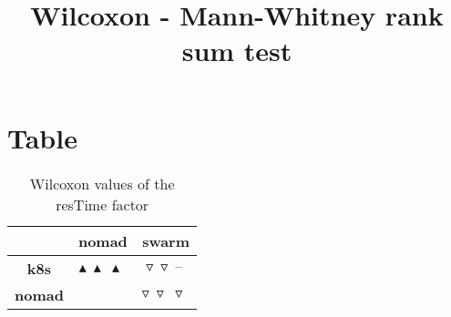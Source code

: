 \documentclass{article}
\title{Wilcoxon - Mann-Whitney rank sum test}
\author{}
\begin{document}
\maketitle
\section{Table}
\begin{table}[!htp]
  \caption{Wilcoxon values of the resTime factor}
  \label{table:resTime}
  \centering
  \begin{scriptsize}
  \begin{tabular}{c|cc}
      & \textbf{nomad} & \textbf{swarm} \\\hline
      \textbf{k8s} & $\blacktriangle\ \blacktriangle\ \blacktriangle\  $ & $ \triangledown\ \triangledown\ \text{--}\ $ \\
      \textbf{nomad} & $ $ & $ \triangledown\ \triangledown\ \triangledown\ $ \\
  \end{tabular}
  \end{scriptsize}
\end{table}
\end{document}

